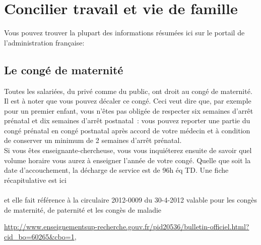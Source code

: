 
\chapter{Concilier travail et vie de famille}

Vous pouvez trouver la plupart des informations r\'esum\'ees ici sur
le portail de l'administration fran\c{c}aise:\\

\section{Le cong\'e de maternit\'e}

Toutes les salari\'ees, du priv\'e comme du public, ont droit au
cong\'e de maternit\'e.
Il est \`a noter que vous pouvez d\'ecaler ce cong\'e. Ceci veut dire
que, par exemple pour un premier enfant, vous n'\^etes pas oblig\'ee de
respecter six semaines d'arr\^et pr\'enatal et dix semaines d'arr\^et
postnatal~: vous pouvez reporter une partie du cong\'e pr\'enatal en
cong\'e postnatal apr\`es accord de votre m\'edecin et
\`a condition de conserver un minimum de
2 semaines d'arr\^et pr\'enatal.\\

Si vous \^etes enseignante-chercheuse, vous vous inqui\'eterez ensuite
de savoir quel volume horaire vous aurez \`a enseigner l'ann\'ee de
votre cong\'e. Quelle que soit la date d'accouchement, la d\'echarge de service est de 96h \'eq TD. Une fiche r\'ecapitulative est ici\\
{\footnotesize{}}\\
et elle fait r\'ef\'erence \`a la circulaire 2012-0009 du 30-4-2012 valable pour les cong\`es de maternit\'e, de paternit\'e et les cong\`es de maladie

\url{http://www.enseignementsup-recherche.gouv.fr/pid20536/bulletin-officiel.html?cid_bo=60265&cbo=1},




